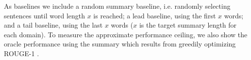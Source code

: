 As baselines we include a random summary baseline, i.e. randomly selecting sentences until word length $x$ is reached; a lead baseline, using 
the first $x$ words;  and a tail baseline, using the last $x$ words
($x$ is the target summary length for each domain).
To measure the approximate performance ceiling,
we also show the oracle performance using the 
summary which results from greedily optimizing ROUGE-1 .












